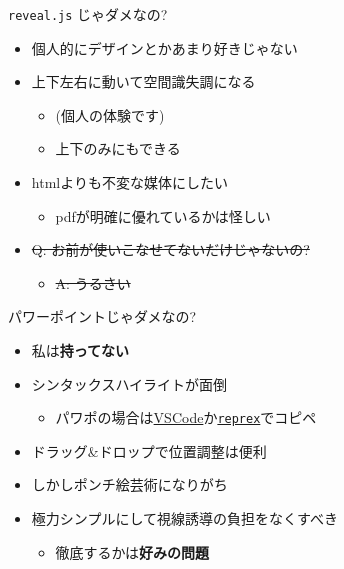 \documentclass[
  12pt,
  ignorenonframetext,
]{beamer}
\providecommand{\tightlist}{%
  \setlength{\itemsep}{0pt}\setlength{\parskip}{0pt}}
\begin{document}
\begin{frame}{\texttt{reveal.js} じゃダメなの?}
\protect\hypertarget{reveal.js-ux3058ux3083ux30c0ux30e1ux306aux306e}{}

\begin{itemize}
\tightlist
\item
  個人的にデザインとかあまり好きじゃない
\item
  上下左右に動いて空間識失調になる

  \begin{itemize}
  \tightlist
  \item
    (個人の体験です)
  \item
    上下のみにもできる
  \end{itemize}
\item
  htmlよりも不変な媒体にしたい

  \begin{itemize}
  \tightlist
  \item
    pdfが明確に優れているかは怪しい
  \end{itemize}
\item
  \sout{Q: お前が使いこなせてないだけじゃないの?}

  \begin{itemize}
  \tightlist
  \item
    \sout{A: うるさい}
  \end{itemize}
\end{itemize}

\end{frame}

\begin{frame}[fragile]{パワーポイントじゃダメなの?}
\protect\hypertarget{ux30d1ux30efux30fcux30ddux30a4ux30f3ux30c8ux3058ux3083ux30c0ux30e1ux306aux306e}{}

\begin{itemize}
\tightlist
\item
  私は\textbf{持ってない}
\item
  シンタックスハイライトが面倒

  \begin{itemize}
  \tightlist
  \item
    パワポの場合は\href{https://notchained.hatenablog.com/entry/2017/02/20/221446}{VSCode}か\href{https://reprex.tidyverse.org/articles/articles/rtf.html}{\texttt{reprex}}でコピペ
  \end{itemize}
\item
  ドラッグ\&ドロップで位置調整は便利
\item
  しかしポンチ絵芸術になりがち
\item
  極力シンプルにして視線誘導の負担をなくすべき

  \begin{itemize}
  \tightlist
  \item
    徹底するかは\textbf{好みの問題}
  \end{itemize}
\end{itemize}

\end{frame}
\end{document}

